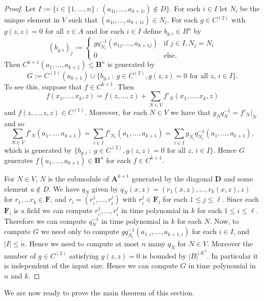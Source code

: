 \documentclass[12pt]{amsart}
\numberwithin{equation}{section}
\theoremstyle{plain}
\theoremstyle{definition}
\newcommand{\st}{\ :\ }
\newcommand{\A}{\mathbf{A}}
\newcommand{\B}{\mathbf{B}}
\newcommand{\D}{\mathbf{D}}
\newcommand{\F}{\mathbf{F}}
\begin{document}
\begin{proof}
  Let $I := \{ i\in \{1,\dots,n\} \st (a_{1i},\dots,a_{k+1i}) \not\in D \}$.
  For each $i\in I$ let $N_i$ be the unique element in $V$ such that $(a_{1i},\dots,a_{k+1i})\in N_i$.
  For each $g\in C^{(2)}$ with $g(z,z) = 0$ for all $z \in A$ and for each $i\in I$ define $b_{g,i}\in B^n$ by
    \[ (b_{g,i})_j := \begin{cases} gq_{N_i}^{-1}(a_{1j},\dots,a_{k+1j}) & \text{if } j\in I, N_j = N_i \\ 0 & \text{else.} \end{cases} \]
  Then $C^{k+1}(a_1,\dots,a_{k+1}) \le \B^n$ is generated by
    \[ G:= C^{(1)}(a_{k+1}) \cup \{ b_{g,i} \st g\in C^{(2)}, g(z,z) = 0 \text{ for all } z, \, i \in I \}. \]
  To see this, suppose that $f \in C^{k+1}$. 
  Then 
    \[f(x_1, \dots, x_k,z)  = f(z,\dots,z) + \sum_{N \in V} f'_{N}(x_1,\dots, x_k,z)\]
    and $f(z,\dots,z,z) \in C^{(1)}$. 
  Moreover, for each $N \in V$ we have that $g_N q_N^{-1} = f'_N|_N$
    and so 
    \[ \sum_{N \in V} f'_{N}(a_1, \dots, a_{k+1}) = \sum_{i \in I} f'_{N_i}(a_1, \dots, a_{k+1}) = \sum_{i \in I} g_{N_i}q_{N_i}^{-1}(a_1, \dots, a_{k+1}), \]
    which is generated by  $\{ b_{g,i} \st g\in C^{(2)}, g(z,z) = 0 \text{ for all } z, \, i \in I \}$. 
  Hence $G$ generates $f(a_1, \dots, a_{k+1}) \in \B^n$ for each $f \in C^{k+1}$. 
 

  For $N \in V$, $N$ is the submodule of $\A^{k+1}$ generated by the diagonal $\D$ and some 
    element $a \notin D$.
  We have $q_N$ given by $q_N(x,z) = (r_1(x,z), \dots, r_k(x,z),z)$ for $r_1, \dots r_k \in \F$,
    and $r_i = (r_{i}^1, \dots, r_{i}^{\ell})$ with $r_{i}^j \in \F_i$ for each $ 1 \le j \le \ell$. 
  Since each $\F_i$ is a field we can compute $r_i^1, \dots, r_i^\ell$ in time polynomial in $k$ 
    for each $1 \le i \le \ell$. 
  Therefore we can compute $q_N^{-1}$ in time polynomial in $k$ for each $N$. 
  Now, to compute $G$ we need only to compute $gq_{N_i}^{-1}(a_{1,i}, \dots, a_{{k+1},i})$ for each $i \in I$, and $|I| \le n$.
  Hence we need to compute at most $n$ many $q_N$ for $N \in V$.
  Moreover the number of $g \in C^{(2)}$ satisfying $g(z,z) = 0$ is bounded by $|B|^{|A|^2}$. 
  In particular it is independent of the input size. 
  Hence we can compute $G$ in time polynomial in $n$ and $k$. 
\end{proof}

We are now ready to prove the main theorem of this section. 

\smpthm*
\end{document}
